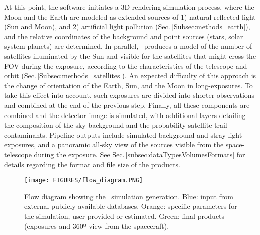 \documentclass[usenames,dvipsnames,modern]{CLASS_FILES/aastex631}  %
\begin{document}
At this point, the software initiates a 3D rendering simulation process, where the Moon and the Earth are modeled as extended sources of 1) natural reflected light (Sun and Moon), and 2) artificial light pollution (Sec.\,\ref{Subsec:methods_earth}), and the relative coordinates of the background and point sources (stars, solar system planets) are determined. In parallel, \MyName\ produces a model of the number of satellites illuminated by the Sun and visible for the satellites that might cross the FOV during the exposure, according to the characteristics of the telescope and orbit (Sec.\,\ref{Subsec:methods_satellites}). An expected difficulty of this approach is the change of orientation of the Earth, Sun, and the Moon in long-exposures. To take this effect into account, such exposures are divided into shorter observations  and combined at the end of the previous step. Finally, all these components are combined and the detector image is simulated, with additional layers detailing the composition of the sky background and the probability satellite  trail contaminants. Pipeline outputs include simulated background and stray light exposures, and a panoramic all-sky view of the sources visible from the space-telescope during the exposure. See Sec.\,\ref{subsec:dataTypesVolumesFormats} for details regarding the format and file size of the products.



\begin{figure*}[t!]
 \begin{center}
\texttt{[image: FIGURES/flow\_diagram.PNG]}
\vspace{-0.85cm}
\caption{Flow diagram showing the \MyName\ simulation generation. Blue: input from external publicly available databases. Orange: specific parameters for the simulation, user-provided or estimated. Green: final products (exposures and 360º view from the spacecraft).}
\label{fig:flow_diagram}
\end{center}
\end{figure*}

\end{document}

